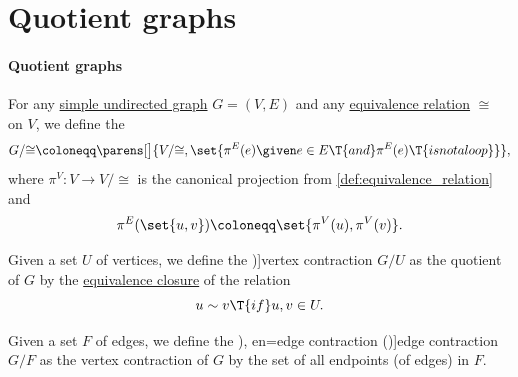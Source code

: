\section{Quotient graphs}\label{sec:quotient_graphs}

\paragraph{Quotient graphs}

\begin{definition}\label{def:quotient_graph}\mimprovised
  For any \hyperref[def:undirected_graph]{simple undirected graph} \( G = (V, E) \) and any \hyperref[def:equivalence_relation]{equivalence relation} \( {\cong} \) on \( V \), we define the 
  \begin{equation*}
    G / {\cong} \coloneqq \parens[\big]{ V / {\cong}, \set{ \pi^E(e) \given e \in E \T{and} \pi^E(e) \T{is not a loop} } },
  \end{equation*}
  where \( \pi^V: V \to V / {\cong} \) is the canonical projection from \cref{def:equivalence_relation} and
  \begin{equation*}
    \pi^E(\set{ u, v }) \coloneqq \set{ \pi^V(u), \pi^V(v) }.
  \end{equation*}

  \begin{thmenum}
     Given a set \( U \) of vertices, we define the \term[ru=отождествление вершин (\cite[22]{ЕмеличевИПр1990ТеорияГрафов})]{vertex contraction} \( G / U \) as the quotient of \( G \) by the \hyperref[def:equivalence_closure]{equivalence closure} of the relation
    \begin{equation*}
      u \sim v \T{if} u, v \in U.
    \end{equation*}

     Given a set \( F \) of edges, we define the \term[ru=стягивание ребра (\cite[21]{ЕмеличевИПр1990ТеорияГрафов}), en=edge contraction (\cite[697]{Rosen2019DiscreteMathematics})]{edge contraction} \( G / F \) as the vertex contraction of \( G \) by the set of all endpoints (of edges) in \( F \).
  \end{thmenum}
\end{definition}
